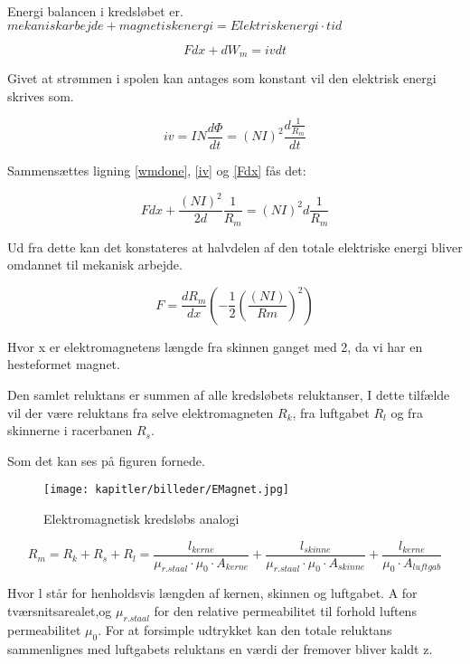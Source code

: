 Energi balancen i kredsløbet er.
$mekanisk arbejde + magnetisk energi =Elektrisk energi \cdot tid$

\begin{equation}
F dx + dW_m = iv dt
\label{Fdx}
\end{equation}

Givet at strømmen i spolen kan antages som konstant vil den elektrisk energi skrives som.

\begin{equation}
iv=IN \frac{d\Phi}{dt} =(NI)^2  \frac{d\frac{1}{R_m}}{dt}
\label{iv}
\end{equation}


Sammensættes ligning \ref{wmdone}, \ref{iv} og \ref{Fdx} fås det:

\begin{equation}
F dx+\frac{(NI)^2}{2d} \frac{1}{R_m} =(NI)^2  d \frac{1}{R_m}
\end{equation}

Ud fra dette kan det konstateres at halvdelen af den totale elektriske energi bliver omdannet til mekanisk arbejde.

\begin{equation}
F = \frac{dR_m}{dx} (-\frac{1}{2} (\frac{(NI)}{Rm} )^2 )
\end{equation}

Hvor x er elektromagnetens længde fra skinnen ganget med 2, da vi har en hesteformet magnet.

Den samlet reluktans er summen af alle kredsløbets reluktanser, I dette tilfælde vil der være reluktans fra selve elektromagneten $R_k$, fra luftgabet $R_l$ og fra skinnerne i racerbanen $R_s$.

Som det kan ses på figuren fornede.

\begin{figure}[ht]
	\label{fig:Mkreds}
	\centering
	\texttt{[image: kapitler/billeder/EMagnet.jpg]}
	\caption{Elektromagnetisk kredsløbs analogi}
	\end{figure}


\begin{equation}
\label{rm1}
R_m =R_k + R_s + R_l = \frac{l_{kerne}}{\mu_{r.staal} \cdot \mu_0 \cdot A_{kerne} } + \frac{l_{skinne}}{\mu_{r.staal} \cdot \mu_0 \cdot A_{skinne} }  + \frac{l_{kerne}}{\mu_0 \cdot A_{luftgab} }
\end{equation}

Hvor l står for henholdsvis længden af kernen, skinnen og luftgabet. A for tværsnitsarealet,og $ \mu_{r.staal} $ for den relative permeabilitet til forhold luftens permeabilitet $\mu_0$.  For at forsimple udtrykket kan den totale reluktans sammenlignes med luftgabets reluktans en værdi  der fremover bliver kaldt z.

